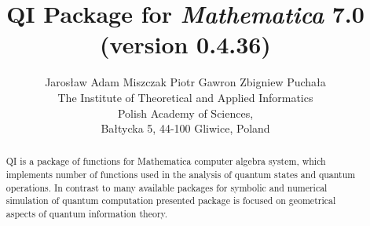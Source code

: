 \documentclass[a4paper,10pt]{scrartcl}
\begin{document}
\title{QI Package for \emph{Mathematica} 7.0 \\(version 0.4.36)}\author{Jaros{\l}aw Adam Miszczak \quad Piotr Gawron \quad Zbigniew Pucha{\l}a\\
{The Institute of Theoretical and Applied Informatics}\\
{Polish Academy of Sciences},\\
{Ba{\l}tycka 5, 44-100 Gliwice, Poland}}
\maketitle
\begin{abstract}QI is a package of functions for Mathematica computer algebra system, which implements number of functions used in the analysis of quantum states and quantum operations. In contrast to many available packages for symbolic and numerical simulation of quantum computation presented package is focused on geometrical aspects of quantum information theory.\end{abstract}

 
 
\end{document}

